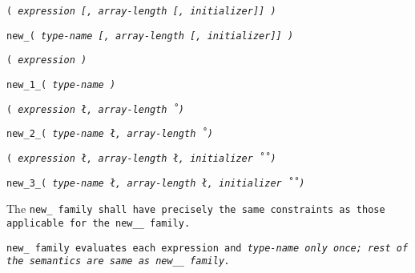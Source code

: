 
\s\s\s\tt{(} \it{expression}
[\tt{,} \it{array-length}
[\tt{,} \it{initializer}]] \tt{)}

 \tt{new_}\s\s\s\tt{(} \it{type-name}
[\tt{,} \it{array-length}
[\tt{,} \it{initializer}]] \tt{)}

\s\tt{(} \it{expression} \tt{)}

 \tt{new_1_}\s\tt{(} \it{type-name}  \tt{)}

\s\tt{(} \it{expression}
\l\tt{,} \it{array-length}\r\  \tt{)}

 \tt{new_2_}\s\tt{(} \it{type-name}
\l\tt{,} \it{array-length}\r\  \tt{)}

\s\tt{(} \it{expression}
\l\tt{,} \it{array-length}
\l\tt{,} \it{initializer}\r\r\ \tt{)}

 \tt{new_3_}\s\tt{(} \it{type-name}
\l\tt{,} \it{array-length}
\l\tt{,} \it{initializer}\r\r\ \tt{)}


The \tt{new_} family shall have precisely the same
constraints as those applicable for the \tt{new__} family.


\tt{new_} family evaluates each expression and \it{type-name} only once;
rest of the semantics are same as \tt{new__} family.
